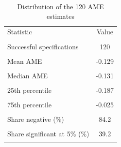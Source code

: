 \begin{table}[htbp]
\centering
\caption{Distribution of the 120 AME estimates}
\label{tab:dist}
\small
\begin{tabular}{lc}
\toprule
Statistic & Value \\\\
\midrule
Successful specifications & 120 \\\\
Mean AME & -0.129 \\\\
Median AME & -0.131 \\\\
25th percentile & -0.187 \\\\
75th percentile & -0.025 \\\\
Share negative (\%) & 84.2 \\\\
Share significant at 5\% (\%) & 39.2 \\\\
\bottomrule
\end{tabular}
\end{table}
